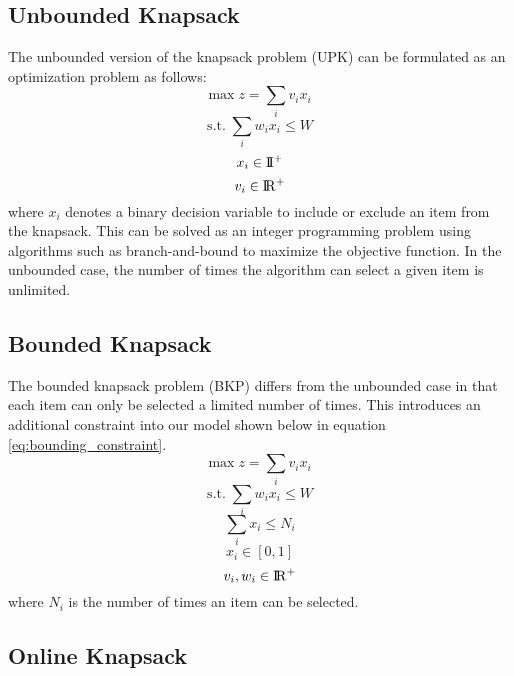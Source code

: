 \documentclass[12pt]{article}
\begin{document}
\subsection{Unbounded Knapsack}

The unbounded version of the knapsack problem (UPK) can be formulated as an optimization problem as follows:
%
\begin{equation}
\textrm{max} \; z = \sum_i v_i x_i
\end{equation}
%
\begin{equation}
\textrm{s.t.} \; \sum_i w_i x_i \leq W
\end{equation}
%
\begin{equation}
x_i \in \rm I\!I^+
\end{equation}
%
\begin{equation}
v_i\in \rm I\!R^+
\end{equation}
%
where $x_i$ denotes a binary decision variable to include or exclude an item from the knapsack. 
This can be solved as an integer programming problem using algorithms such as branch-and-bound to maximize the objective function. 
In the unbounded case, the number of times the algorithm can select a given item is unlimited.

\subsection{Bounded Knapsack}

The bounded knapsack problem (BKP) differs from the unbounded case in that each item can only be selected a limited number of times. 
This introduces an additional constraint into our model shown below in equation \ref{eq:bounding_constraint}.
%
\begin{equation}
\textrm{max} \; z = \sum_i v_i x_i
\end{equation}
%
\begin{equation}
\textrm{s.t.} \; \sum_i w_i x_i \leq W
\end{equation}
%
\begin{equation}
\sum_i x_i \leq N_i
\label{eq:bounding_constraint}
\end{equation}
%
\begin{equation}
x_i \in [0, 1]
\end{equation}
%
\begin{equation}
v_i, w_i \in \rm I\!R^+
\end{equation}
%
where $N_i$ is the number of times an item can be selected.

\subsection{Online Knapsack}
\end{document}
